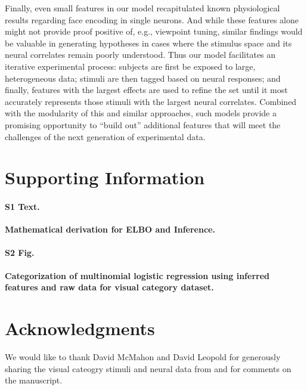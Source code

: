 \documentclass[10pt,letterpaper]{article}
\begin{document}
Finally, even small features in our model recapitulated known physiological results regarding face encoding in single neurons. And while these features alone might not provide proof positive of, e.g., viewpoint tuning, similar findings would be valuable in generating hypotheses in cases where the stimulus space and its neural correlates remain poorly understood. Thus our model facilitates an iterative experimental process: subjects are first be exposed to large, heterogeneous data; stimuli are then tagged based on neural responses; and finally, features with the largest effects are used to refine the set until it most accurately represents those stimuli with the largest neural correlates. Combined with the modularity of this and similar approaches, such models provide a promising opportunity to ``build out'' additional features that will meet the challenges of the next generation of experimental data.




\section*{Supporting Information}

\paragraph*{S1 Text.}
\label{S1_Text}
{\bf Mathematical derivation for ELBO and Inference.}

 \paragraph*{S2 Fig.}
 \label{S2_Fig}
 {\bf Categorization of multinomial logistic regression using inferred features and raw data for visual category dataset.}

\section*{Acknowledgments}
We would like to thank David McMahon and David Leopold for generously sharing the visual cateogry stimuli and neural data from \cite{McMahon2014-qq} and for comments on the manuscript.

\nolinenumbers

%
%
%

{}
\end{document}
